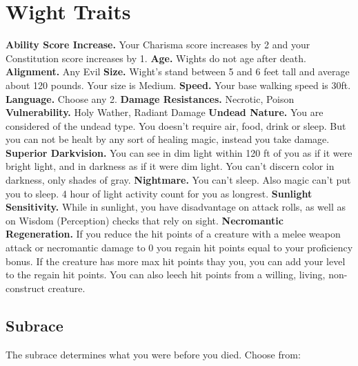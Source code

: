 \documentclass[a4paper,10pt,twoside,twocolumn]{dndbook} %
\begin{document}
	\section{Wight Traits}
	\textbf{Ability Score Increase.} Your Charisma score increases by 2 and your Constitution score increases by 1.\linebreak
	\textbf{Age.} Wights do not age after death.\linebreak
	\textbf{Alignment.} Any Evil\linebreak
	\textbf{Size.} Wight's stand between 5 and 6 feet tall and average about 120 pounds. Your size is Medium.\linebreak
	\textbf{Speed.} Your base walking speed is 30ft.\linebreak
	\textbf{Language.} Choose any 2.\linebreak
	\textbf{Damage Resistances.} Necrotic, Poison\linebreak
	\textbf{Vulnerability.} Holy Wather, Radiant Damage\linebreak
	\textbf{Undead Nature.} You are considered of the undead type. You doesn't require air, food, drink or sleep. But you can not be healt by any sort of healing magic, instead you take damage. \linebreak
	\textbf{Superior Darkvision.} You can see in dim light within 120 ft of you as if it were bright light, and in darkness as if it were dim light. You can't discern color in darkness, only shades of gray.\linebreak
	\textbf{Nightmare.} You can't sleep. Also magic can't put you to sleep. 4 hour of light activity count for you as longrest.\linebreak
	\textbf{Sunlight Sensitivity.} While in sunlight, you have disadvantage on attack rolls, as well as on Wisdom (Perception) checks that rely on sight.\linebreak
	\textbf{Necromantic Regeneration.} If you reduce the hit points of a creature with a melee weapon attack or necromantic damage to 0 you regain hit points equal to your proficiency bonus. If the creature has more max hit points thay you, you can add your level to the regain hit points. You can also leech hit points from a willing, living, non-construct creature.\linebreak
	\subsection{Subrace} The subrace determines what you were before you died. Choose from:\linebreak
\end{document}

